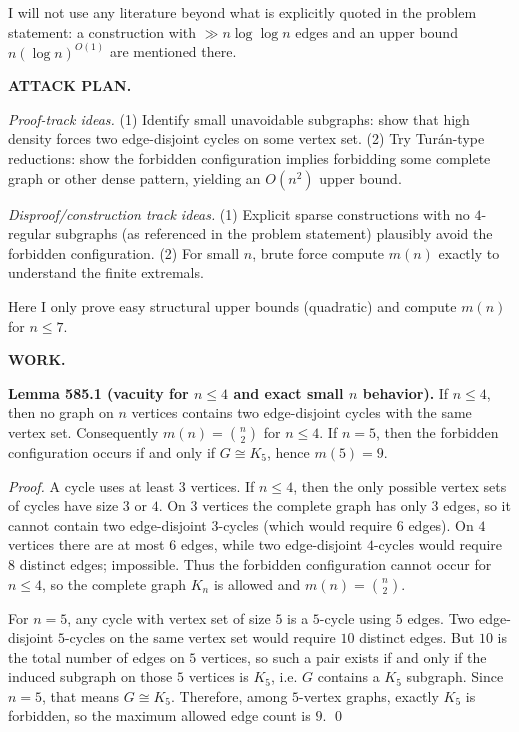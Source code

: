 I will not use any literature beyond what is explicitly quoted in the problem statement: a construction with $\gg n\log\log n$ edges and an upper bound $n(\log n)^{O(1)}$ are mentioned there.

\bigskip
\noindent\textbf{ATTACK PLAN.}

\emph{Proof-track ideas.}
(1) Identify small unavoidable subgraphs: show that high density forces two edge-disjoint cycles on some vertex set.
(2) Try Tur\'an-type reductions: show the forbidden configuration implies forbidding some complete graph or other dense pattern, yielding an $O(n^2)$ upper bound.

\emph{Disproof/construction track ideas.}
(1) Explicit sparse constructions with no $4$-regular subgraphs (as referenced in the problem statement) plausibly avoid the forbidden configuration.
(2) For small $n$, brute force compute $m(n)$ exactly to understand the finite extremals.

Here I only prove easy structural upper bounds (quadratic) and compute $m(n)$ for $n\le 7$.

\bigskip
\noindent\textbf{WORK.}

\noindent\textbf{Lemma 585.1 (vacuity for $n\le 4$ and exact small $n$ behavior).}
If $n\le 4$, then no graph on $n$ vertices contains two edge-disjoint cycles with the same vertex set.
Consequently $m(n)=\binom n2$ for $n\le 4$.
If $n=5$, then the forbidden configuration occurs if and only if $G\cong K_5$, hence $m(5)=9$.

\noindent\emph{Proof.}
A cycle uses at least $3$ vertices.
If $n\le 4$, then the only possible vertex sets of cycles have size $3$ or $4$.
On $3$ vertices the complete graph has only $3$ edges, so it cannot contain two edge-disjoint $3$-cycles (which would require $6$ edges).
On $4$ vertices there are at most $6$ edges, while two edge-disjoint $4$-cycles would require $8$ distinct edges; impossible.
Thus the forbidden configuration cannot occur for $n\le 4$, so the complete graph $K_n$ is allowed and $m(n)=\binom n2$.

For $n=5$, any cycle with vertex set of size $5$ is a $5$-cycle using $5$ edges.
Two edge-disjoint $5$-cycles on the same vertex set would require $10$ distinct edges.
But $10$ is the total number of edges on $5$ vertices, so such a pair exists if and only if the induced subgraph on those $5$ vertices is $K_5$, i.e. $G$ contains a $K_5$ subgraph. Since $n=5$, that means $G\cong K_5$.
Therefore, among $5$-vertex graphs, exactly $K_5$ is forbidden, so the maximum allowed edge count is $9$.
\qed

